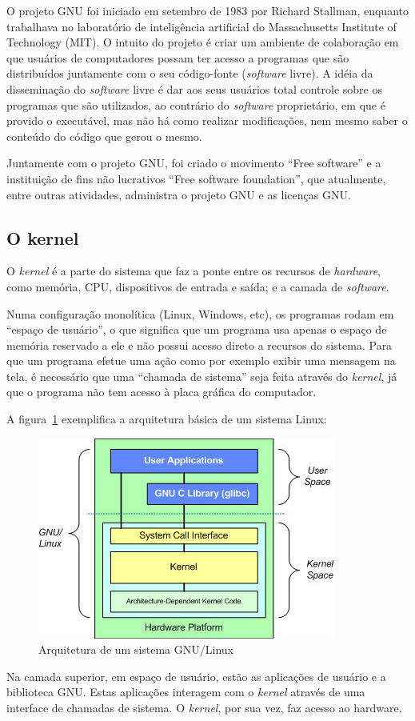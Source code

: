 \documentclass{handout_utfpr}
\begin{document}
O projeto GNU foi iniciado em setembro de 1983 por Richard Stallman, enquanto trabalhava no laboratório de inteligência artificial do Massachusetts Institute of Technology (MIT). O intuito do projeto é criar um ambiente de colaboração em que usuários de computadores possam ter acesso a programas que são distribuídos juntamente com o seu código-fonte (\textit{software} livre). A idéia da disseminação do \textit{software} livre é dar aos seus usuários total controle sobre os programas que são utilizados, ao contrário do \textit{software} proprietário, em que é provido o executável, mas não há como realizar modificações, nem mesmo saber o conteúdo do código que gerou o mesmo.

Juntamente com o projeto GNU, foi criado o movimento ``Free software'' e a instituição de fins não lucrativos ``Free software foundation'', que atualmente, entre outras atividades, administra o projeto GNU e as licenças GNU.

\subsection{O kernel}\label{kernel}
O \textit{kernel} é a parte do sistema que faz a ponte entre os recursos de \textit{hardware}, como memória, CPU, dispositivos de entrada e saída; e a camada de \textit{software}.

Numa configuração monolítica (Linux, Windows, etc), os programas rodam em ``espaço de usuário'', o que significa que um programa usa apenas o espaço de memória reservado a ele e não possui acesso direto a recursos do sistema. Para que um programa efetue uma ação como por exemplo exibir uma mensagem na tela, é necessário que uma ``chamada de sistema'' seja feita através do \textit{kernel}, já que o programa não tem acesso à placa gráfica do computador.

A figura~\ref{fig:kernel} exemplifica a arquitetura básica de um sistema Linux:
\begin{figure}[!h]
  \centering
  \includegraphics[scale=.8]{imagens/kernel.jpg}
  \caption{Arquitetura de um sistema GNU/Linux}
  \label{fig:kernel}
\end{figure}
Na camada superior, em espaço de usuário, estão as aplicações de usuário e a biblioteca GNU\@. Estas aplicações interagem com o \textit{kernel} através de uma interface de chamadas de sistema. O \textit{kernel}, por sua vez, faz acesso ao hardware.
\end{document}
